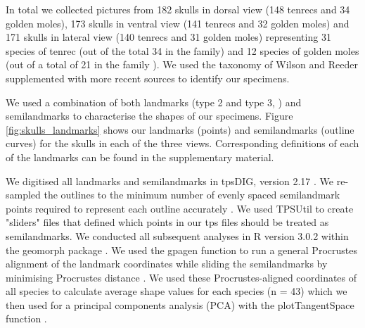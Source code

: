 \documentclass[12pt,a4paper]{article}
\begin{document}

	In total we collected pictures from 182 skulls in dorsal view (148 tenrecs and 34 golden moles), 173 skulls in ventral view (141 tenrecs and 32 golden moles) and 171 skulls in lateral view (140 tenrecs and 31 golden moles) representing 31 species of tenrec (out of the total 34 in the family) and 12 species of golden moles (out of a total of 21 in the family \citep{Asher2010}). We used the taxonomy of Wilson and Reeder \citeyearpar{Wilson2005} supplemented with more recent sources \citep{Olson2013} to identify our specimens. 
	

	We used a combination of both landmarks (type 2 and type 3, \citep{Zelditch2012}) and semilandmarks to characterise the shapes of our specimens. Figure \ref{fig:skulls_landmarks} shows our landmarks (points) and semilandmarks (outline curves) for the skulls in each of the three views. Corresponding definitions of each of the landmarks can be found in the supplementary material.
	

	We digitised all landmarks and semilandmarks in tpsDIG, version 2.17 \citep{Rohlf2013}. We re-sampled the outlines to the minimum number of evenly spaced semilandmark points required to represent each outline accurately \citep[][details in supplementary material]{MacLeod2013}. We used TPSUtil \citep{Rohlf2012} to create "sliders" files \citep{Zelditch2012} that defined which points in our tps files should be treated as semilandmarks. We conducted all subsequent analyses in R version 3.0.2 \citep{Team2014} within the geomorph package \citep{Adams2013}. 
	We used the gpagen function to run a general Procrustes alignment \citep{Rohlf1993} of the landmark coordinates while sliding the semilandmarks by minimising Procrustes distance \citep{Bookstein1997}. We used these Procrustes-aligned coordinates of all species to calculate average shape values for each species (n = 43) which we then used for a principal components analysis (PCA) with the plotTangentSpace function \citep{Adams2013}. 
	
\end{document}
